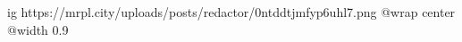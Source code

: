  
 
 
 
 

\ifcmt
  ig https://mrpl.city/uploads/posts/redactor/0ntddtjmfyp6uhl7.png
  @wrap center
  @width 0.9
\fi
